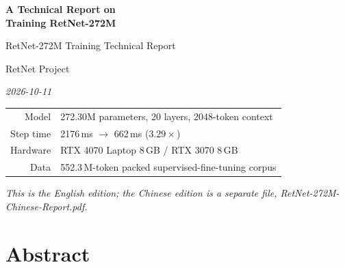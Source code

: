 \documentclass[11pt,openany]{article}
\begin{document}
\thispagestyle{empty}

\begin{center}
\vspace*{3.2cm}

{\LARGE\bfseries A Technical Report on\\[0.25em] Training RetNet-272M}

\vspace{0.55cm}

{\large RetNet-272M Training Technical Report}

\vspace{1.1cm}

{\normalsize RetNet Project}

\vspace{0.25cm}

{\small\itshape 2026-10-11}

\vspace{2.2cm}

\begin{minipage}{0.80\textwidth}
\centering\small
\begin{tabular}{@{}rl@{}}
\toprule
Model & 272.30M parameters, 20 layers, 2048-token context \\
Step time & 2176\,ms $\rightarrow$ 662\,ms ($3.29\times$) \\
Hardware & RTX 4070 Laptop 8\,GB / RTX 3070 8\,GB \\
Data & 552.3\,M-token packed supervised-fine-tuning corpus \\
\bottomrule
\end{tabular}
\end{minipage}

\vfill

{\small\itshape This is the English edition; the Chinese edition is a separate file,
RetNet-272M-Chinese-Report.pdf.}

\vspace{1.2cm}
\end{center}

\clearpage

\section*{Abstract}
\end{document}
